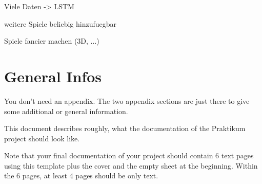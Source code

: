\documentclass{utue} %
\begin{document}
Viele Daten -> LSTM

weitere Spiele beliebig hinzufuegbar

Spiele fancier machen (3D, ...)


\appendix

\section{General Infos}

You don't need an appendix. The two appendix sections are just there to give some additional or general information.

This document describes roughly, what the documentation of the Praktikum project should look like.

Note that your final documentation of your project should contain 6 text pages using this template plus the cover and the empty sheet at the beginning. Within the 6 pages, at least 4 pages should be only text.




\end{document}
